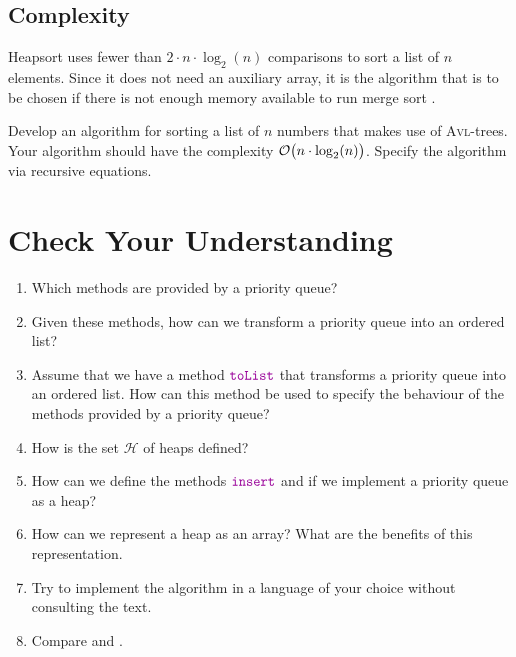 \subsection{Complexity}
Heapsort uses fewer than $2 \cdot n \cdot \log_2(n)$ comparisons to sort a list of $n$ elements.  Since it does
not need an auxiliary array, it is the algorithm that is to be chosen if there is not enough memory available
to run merge sort \cite{sedgewick:2011}.  

\exercise
Develop an algorithm for sorting a list of $n$ numbers that makes use of \textsc{Avl}-trees.  Your algorithm
should have the complexity $\mathcal{O}\bigl(n \cdot \log_2(n)\bigr)$.  Specify the algorithm via recursive equations.
\eox

\section{Check Your Understanding}
\begin{enumerate}
\item Which methods are provided by a priority queue?
\item Given these methods, how can we transform a priority queue into an ordered list?
\item Assume that we have a method $\mytt{toList}$ that transforms a priority queue into
      an ordered list.  How can this method be used to specify the behaviour of the methods
      provided by a priority queue?
\item How is the set $\mathcal{H}$ of heaps defined?
\item How can we define the methods $\mytt{insert}$ and  if we implement a priority queue as a
      heap? 
\item How can we represent a heap as an array?  What are the benefits of this representation.
\item Try to implement the algorithm  in a language of your choice without consulting the text.
\item Compare  and . 
\end{enumerate}

